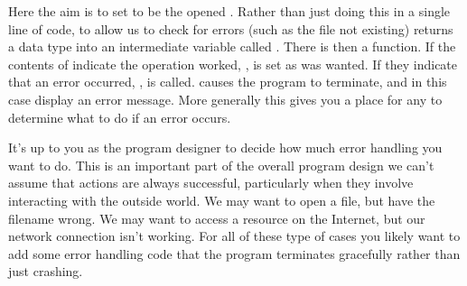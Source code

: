 \documentclass[letterpaper,10pt,british]{sphinxmanual}
\begin{document}
\begin{sphinxVerbatim}[commandchars=\\\{\}]

\end{sphinxVerbatim}

\sphinxAtStartPar
Here the aim is to set  to be the opened . Rather than just doing this in a single line of code, to allow us to check for errors (such as the file not existing)  returns a  data type into an intermediate variable called . There is then a  function. If the contents of  indicate the operation worked, ,  is set as was wanted. If they indicate that an error occurred, ,  is called.  causes the program to terminate, and in this case display an error message. More generally this gives you a place for any  to determine what to do if an error occurs.

\sphinxAtStartPar
It’s up to you as the program designer to decide how much error handling you want to do. This is an important part of the overall program design \sphinxhyphen{} we can’t assume that actions are always successful, particularly when they involve interacting with the outside world. We may want to open a file, but have the filename wrong. We may want to access a resource on the Internet, but our network connection isn’t working. For all of these type of cases you likely want to add some error handling code that the program terminates gracefully rather than just crashing.
\end{document}
